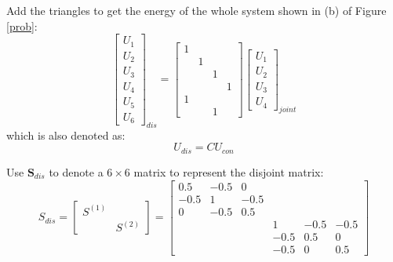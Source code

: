 \documentclass[a4paper,titlepage]{article}
\begin{document}
		Add the triangles to get the energy of the whole system shown in (b) of Figure \ref{prob}:
		$$
			\begin{bmatrix}
				U_1 \\
				U_2 \\
				U_3 \\
				U_4 \\
				U_5 \\
				U_6				
			\end{bmatrix}_{dis} = 
			\begin{bmatrix}
				1&&&\\
				&1&&\\
				&&1&\\
				&&&1\\
				1&&&\\
				&&1&
			\end{bmatrix}
			\begin{bmatrix}
				U_1 \\
				U_2 \\
				U_3 \\
				U_4
			\end{bmatrix}_{joint}
		$$
		which is also denoted as:
		$$
			U_{dis} = CU_{con}
		$$
		
		Use $\textbf{S}_{dis}$ to denote a $6\times 6$ matrix to represent the disjoint matrix:
		$$
			S_{dis} = 
			\begin{bmatrix}
				S^{(1)} & \\
				 & S^{(2)}				
			\end{bmatrix} = 
			\begin{bmatrix}
				0.5 & -0.5 & 0 & & & \\
				-0.5 & 1 & -0.5 & & & \\
				0 & -0.5 & 0.5 & & & \\
				& & & 1 & -0.5 & -0.5 \\
				& & & -0.5 & 0.5 & 0 \\
				& & & -0.5 & 0 & 0.5
			\end{bmatrix}
		$$
		
\end{document}
